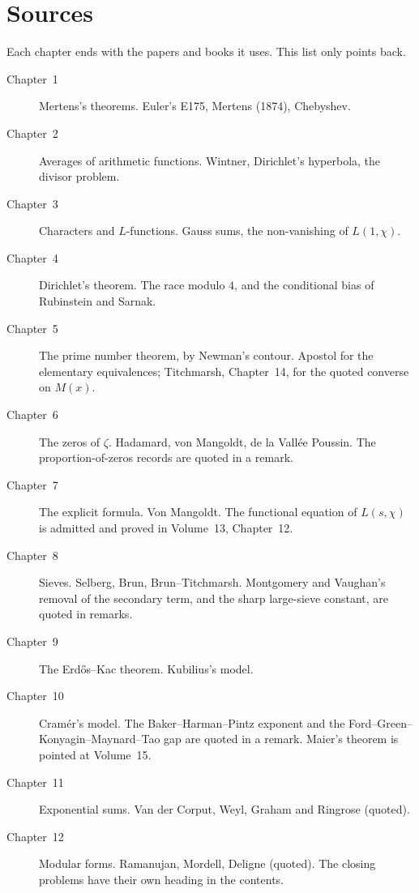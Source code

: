 \chapter*{Sources}
\noindent Each chapter ends with the papers and books it uses. This list only points back.

\begin{description}
\item[Chapter~1] Mertens's theorems. Euler's E175, Mertens (1874), Chebyshev.
\item[Chapter~2] Averages of arithmetic functions. Wintner, Dirichlet's hyperbola, the divisor problem.
\item[Chapter~3] Characters and $L$-functions. Gauss sums, the non-vanishing of $L(1,\chi)$.
\item[Chapter~4] Dirichlet's theorem. The race modulo $4$, and the conditional bias of Rubinstein and Sarnak.
\item[Chapter~5] The prime number theorem, by Newman's contour. Apostol for the elementary equivalences; Titchmarsh, Chapter~14, for the quoted converse on $M(x)$.
\item[Chapter~6] The zeros of $\zeta$. Hadamard, von Mangoldt, de la Vallée Poussin. The proportion-of-zeros records are quoted in a remark.
\item[Chapter~7] The explicit formula. Von Mangoldt. The functional equation of $L(s,\chi)$ is admitted and proved in Volume~13, Chapter~12.
\item[Chapter~8] Sieves. Selberg, Brun, Brun--Titchmarsh. Montgomery and Vaughan's removal of the secondary term, and the sharp large-sieve constant, are quoted in remarks.
\item[Chapter~9] The Erd\H{o}s--Kac theorem. Kubilius's model.
\item[Chapter~10] Cramér's model. The Baker--Harman--Pintz exponent and the Ford--Green--Konyagin--Maynard--Tao gap are quoted in a remark. Maier's theorem is pointed at Volume~15.
\item[Chapter~11] Exponential sums. Van der Corput, Weyl, Graham and Ringrose (quoted).
\item[Chapter~12] Modular forms. Ramanujan, Mordell, Deligne (quoted). The closing problems have their own heading in the contents.
\end{description}
